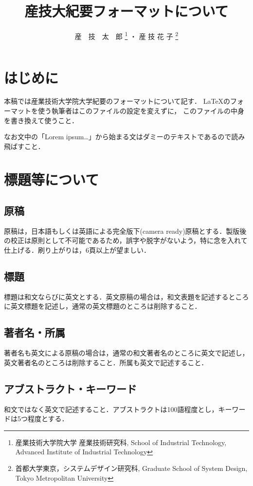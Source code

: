 \documentclass[a4j,9pt,twoside,twocolumn]{jsarticle}
\title{産技大紀要フォーマットについて}
\author{
産　技　太　郎
\thanks{産業技術大学院大学 産業技術研究科, School of Industrial Technology, Advanced Institute of Industrial Technology}
・
産 技 花 子
\thanks{首都大学東京，システムデザイン研究科, Graduate School of System Design, Tokyo
 Metropolitan University}
}
\begin{document}
\pagestyle{empty}
\maketitle\thispagestyle{empty} %
\makereceivedon %

\section{はじめに}
本稿では産業技術大学院大学紀要のフォーマットについて記す．
\LaTeX のフォーマットを使う執筆者はこのファイルの設定を変えずに，
このファイルの中身を書き換えて使うこと．

なお文中の「Lorem ipsum\ldots」から始まる文はダミーのテキストであるので読み飛ばすこと．

\section{標題等について}
\subsection{原稿}
原稿は，日本語もしくは英語による完全版下(camera ready)原稿とする．製版後の校正は原則として不可能であるため，誤字や脱字がないよう，特に念を入れて仕上げる．刷り上がりは，6頁以上が望ましい．

\subsection{標題}
標題は和文ならびに英文とする．英文原稿の場合は，和文表題を記述するところに英文標題を記述し，通常の英文標題のところは削除すること．

\subsection{著者名・所属}
著者名も英文による原稿の場合は，通常の和文著者名のところに英文で記述し，英文著者名のところは削除すること．所属も英文で記述すること．

\subsection{アブストラクト・キーワード}
和文ではなく英文で記述すること．アブストラクトは100語程度とし，キーワードは5つ程度とする．
\end{document}
